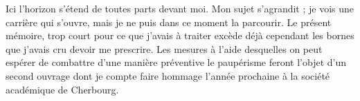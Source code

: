\documentclass[french,twoside]{book} %
\newif\ifdev
\renewcommand{\LettrineFontHook}{\color{rubric}}
\newcommand{\initialiv}[2]{%
  \let\oldLFH\LettrineFontHook
  \IfSubStr{Q}{#1}{
    \lettrine[lines=4, lhang=0.2, loversize=-0.1, lraise=0.2]{\smash{#1}}{#2}
  }{\IfSubStr{É}{#1}{
    \lettrine[lines=4, lhang=0.2, loversize=-0, lraise=0]{\smash{#1}}{#2}
  }{\IfSubStr{ÀÂ}{#1}{
    \lettrine[lines=4, lhang=0.2, loversize=-0, lraise=0, slope=0.6em]{\smash{#1}}{#2}
  }{\IfSubStr{A}{#1}{
    \lettrine[lines=4, lhang=0.2, loversize=0.2, slope=0.6em]{\smash{#1}}{#2}
  }{\IfSubStr{V}{#1}{
    \lettrine[lines=4, lhang=0.2, loversize=0.2, slope=-0.5em]{\smash{#1}}{#2}
  }{
    \lettrine[lines=4, lhang=0.2, loversize=0.2]{\smash{#1}}{#2}
  }}}}}
  \let\LettrineFontHook\oldLFH
}
\renewcommand{\LettrineFontHook}{\bfseries\color{rubric}}
\begin{document}
Ici l’horizon s’étend de toutes parts devant moi. Mon sujet s’agrandit ; je vois une carrière qui s’ouvre, mais je ne puis dans ce moment la parcourir. Le présent mémoire, trop court pour ce que j’avais à traiter excède déjà cependant les bornes que j’avais cru devoir me prescrire. Les mesures à l’aide desquelles on peut espérer de combattre d’une manière préventive le paupérisme feront l’objet d’un second ouvrage dont je compte faire hommage l’année prochaine à la société académique de Cherbourg.
 


\ifdev %
\fontname\font — \textsc{Les règles du jeu}\par
(\hyperref[utopie]{\underline{Lien}})\par
\noindent \initialiv{A}{lors là}\blindtext\par
\noindent \initialiv{À}{ la bonheur des dames}\blindtext\par
\noindent \initialiv{É}{tonnez-le}\blindtext\par
\noindent \initialiv{Q}{ualitativement}\blindtext\par
\noindent \initialiv{V}{aloriser}\blindtext\par
\Blindtext
\phantomsection
\label{utopie}
\Blinddocument
\fi
\end{document}
